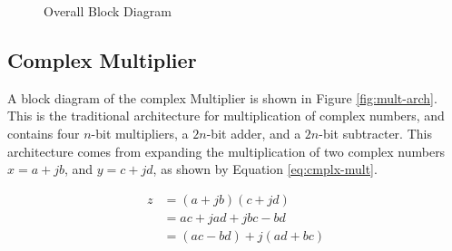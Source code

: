 \begin{figure}[ht]
	\caption{Overall Block Diagram}
	\label{fig:overall-block-diag}
\end{figure}

\FloatBarrier
\subsection{Complex Multiplier} \label{sec:design-mult}

A block diagram of the complex Multiplier is shown in Figure \ref{fig:mult-arch}. This is the traditional architecture for multiplication of complex numbers, and contains four $n$-bit multipliers, a $2n$-bit adder, and a $2n$-bit subtracter. This architecture comes from expanding the multiplication of two complex numbers $x = a + jb$, and $y = c + jd$, as shown by Equation \ref{eq:cmplx-mult}.

\begin{align}
	z &= (a+jb)(c+jd) \nonumber \\
	  &= ac + jad + jbc - bd \nonumber \\
	  &= (ac - bd) + j(ad + bc) \label{eq:cmplx-mult}
\end{align}

